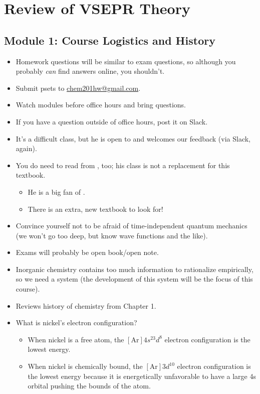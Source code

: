 \documentclass[../notes.tex]{subfiles}
\begin{document}
\chapter{Review of VSEPR Theory}
\section{Module 1: Course Logistics and History}
\begin{itemize}
    \item {}Homework questions will be similar to exam questions, so although you probably \emph{can} find answers online, you shouldn't.
    \item Submit psets to \href{mailto:chem201hw@gmail.com}{chem201hw@gmail.com}.
    \item Watch modules before office hours and bring questions.
    \item If you have a question outside of office hours, post it on Slack.
    \item It's a difficult class, but he is open to and welcomes our feedback (via Slack, again).
    \item You do need to read from \textcite{bib:MiesslerFischerTarr}, too; his class is not a replacement for this textbook.
    \begin{itemize}
        \item He is a big fan of \textcite{bib:Cotton}.
        \item There is an extra, new textbook to look for!
    \end{itemize}
    \item Convince yourself not to be afraid of time-independent quantum mechanics (we won't go too deep, but know wave functions and the like).
    \item Exams will probably be open book/open note.
    \item Inorganic chemistry contains too much information to rationalize empirically, so we need a system (the development of this system will be the focus of this course).
    \item Reviews history of chemistry from \textcite{bib:MiesslerFischerTarr} Chapter 1.
    \item What is nickel's electron configuration?
    \begin{itemize}
        \item When nickel is a free atom, the $[\text{Ar}]4s^23d^8$ electron configuration is the lowest energy.
        \item When nickel is chemically bound, the $[\text{Ar}]3d^{10}$ electron configuration is the lowest energy because it is energetically unfavorable to have a large 4s orbital pushing the bounds of the atom.

\end{itemize}
\end{itemize}
\end{document}
